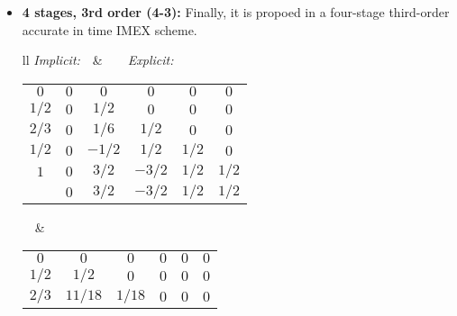 \begin{itemize}
\begin{center}
\begin{tabular}{l}
\textit{Implicit:}\\
\begin{tabular}{c|cccc}
$0$&$0$&$0$&$0$&$0$\\
$0.4358665215$&$0$&$0.4358665215$&$0$&$0$\\
$0.7179332608$&$0$&$0.2820667392$&$0.4358665215$&$0$\\
$1$&$0$&$1.208496649$&$-0.644363171$&$0.4358665215$\\
\hline
&$0$&$1.208496649$&$-0.644363171$&$0.4358665215$
\end{tabular}\\
\textit{Explicit:}\\
\begin{tabular}{c|cccc}
$0$&$0$&$0$&$0$&$0$\\
$0.4358665215$&$0.4358665215$&$0$&$0$&$0$\\
$0.7179332608$&$0.3212788860$&$0.3966543747$&$0$&$0$\\
$1$&$-0.105858296$&$0.5529291479$&$0.5529291479$&$0$\\
\hline
&$0$&$1.208496649$&$-0.644363171$&$0.4358665215$
\end{tabular}
\end{tabular}
\end{center}
\item \textbf{4 stages, 3rd order (4-3):}
Finally, it is propoed in \cite{ascher_implicit-explicit_1997} a four-stage third-order accurate in time IMEX scheme.
\begin{center}
\begin{tabular}{ll}
\textit{Implicit:}$\quad$&$\quad\quad$\textit{Explicit:}\\
\begin{tabular}{c|ccccc}
$0$&$0$&$0$&$0$&$0$&$0$\\
$1/2$&$0$&$1/2$&$0$&$0$&$0$\\
$2/3$&$0$&$1/6$&$1/2$&$0$&$0$\\
$1/2$&$0$&$-1/2$&$1/2$&$1/2$&$0$\\
$1$&$0$&$3/2$&$-3/2$&$1/2$&$1/2$\\
\hline
&$0$&$3/2$&$-3/2$&$1/2$&$1/2$
\end{tabular}$\quad$&
$\quad\quad$\begin{tabular}{c|ccccc}
$0$&$0$&$0$&$0$&$0$&$0$\\
$1/2$&$1/2$&$0$&$0$&$0$&$0$\\
$2/3$&$11/18$&$1/18$&$0$&$0$&$0$\\

\end{tabular}
\end{tabular}
\end{center}
\end{itemize}
